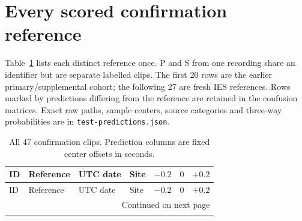 \documentclass[a4paper,11pt,oneside]{article}
\newcommand{\code}[1]{\nolinkurl{#1}}
\begin{document}
\section{Every scored confirmation reference}
Table~\ref{tab:allrefs} lists each distinct reference once. P and S from one
recording share an identifier but are separate labelled clips. The first
20 rows are the earlier primary/supplemental cohort; the following 27 are
fresh IES references. Rows marked by predictions differing from the reference
are retained in the confusion matrices. Exact raw paths, sample centers,
source categories and three-way probabilities are in
\code{test-predictions.json}.
\begingroup\small
\begin{longtable}{lllllll}
\caption{All 47 confirmation clips. Prediction columns are fixed center offsets
in seconds.}\label{tab:allrefs}\\
\toprule ID & Reference & UTC date & Site & $-0.2$ & $0$ & $+0.2$ \\\midrule\endfirsthead
\toprule ID & Reference & UTC date & Site & $-0.2$ & $0$ & $+0.2$ \\\midrule\endhead
\midrule\multicolumn{7}{r}{Continued on next page}\\\endfoot
\bottomrule\endlastfoot

\end{longtable}
\endgroup

\FloatBarrier
\clearpage


\end{document}
